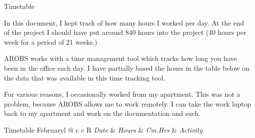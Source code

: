 \documentclass{matthijs}
\begin{document}

	\thispagestyle{empty}

	\begin{hoofdstuk}{Timetable}

		In this document, I kept track of how many hours I worked per day.
		At the end of the project I should have put around 840 hours into the project (40 hours per week for a period of 21 weeks.)
		
		\bigskip

		AROBS works with a time management tool which tracks how long you have been in the office each day.
		I have partially based the hours in the table below on the data that was available in this time tracking tool.
		
		\bigskip

		For various reasons, I occasionally worked from my apartment.
		This was not a problem, because AROBS allows me to work remotely.
		I can take the work laptop back to my apartment and work on the documentation and such.

		\bigskip

		\begin{tabel}{Timetable February}{l @{\extracolsep{\fill}} c c R}
			\emph{Date} & \emph{Hours} & \emph{Cm.Hrs} & \emph{Activity} \\
			\midrule


\end{tabel}
\end{hoofdstuk}
\end{document}
